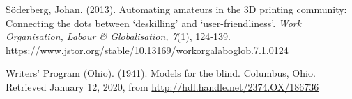 \documentclass[11.5pt]{sig-alternate} %
\begin{document}
\begin{hangparas}{0.25in}{1}
Söderberg, Johan. (2013). Automating amateurs in the 3D printing community: Connecting the dots between ‘deskilling’ and ‘user-friendliness’. \textit{Work Organisation, Labour \& Globalisation, 7}(1), 124-139. \url{https://www.jstor.org/stable/10.13169/workorgalaboglob.7.1.0124}

Writers' Program (Ohio). (1941). Models for the blind. Columbus, Ohio. Retrieved January 12, 2020, from \url{http://hdl.handle.net/2374.OX/186736}

\end{hangparas}
\end{document}
